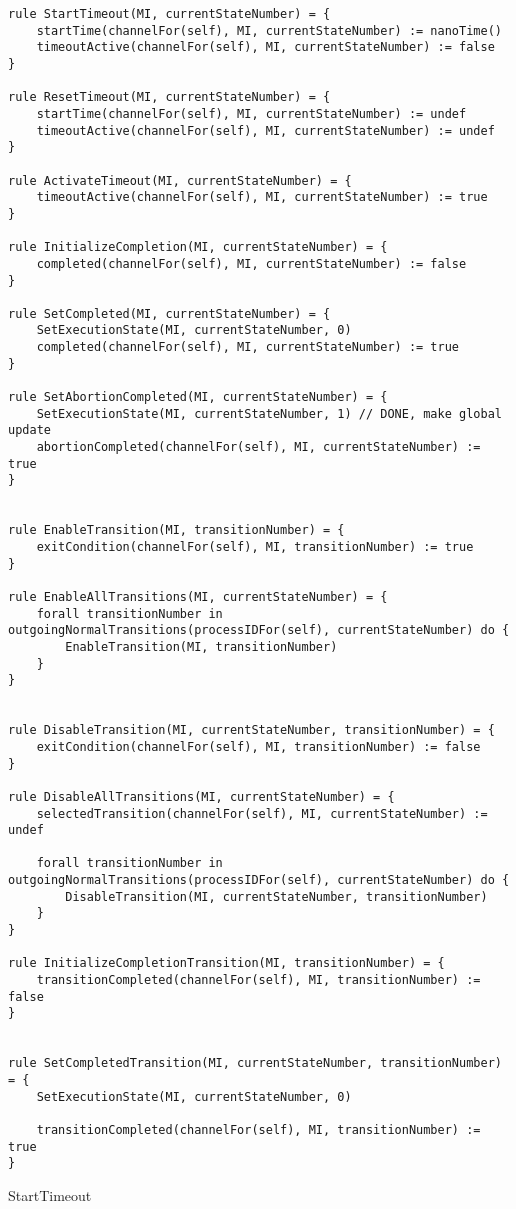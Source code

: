 \begin{listing}[H]
\begin{verbatim}
rule StartTimeout(MI, currentStateNumber) = {
    startTime(channelFor(self), MI, currentStateNumber) := nanoTime()
    timeoutActive(channelFor(self), MI, currentStateNumber) := false
}

rule ResetTimeout(MI, currentStateNumber) = {
    startTime(channelFor(self), MI, currentStateNumber) := undef
    timeoutActive(channelFor(self), MI, currentStateNumber) := undef
}

rule ActivateTimeout(MI, currentStateNumber) = {
    timeoutActive(channelFor(self), MI, currentStateNumber) := true
}

rule InitializeCompletion(MI, currentStateNumber) = {
    completed(channelFor(self), MI, currentStateNumber) := false
}

rule SetCompleted(MI, currentStateNumber) = {
    SetExecutionState(MI, currentStateNumber, 0)
    completed(channelFor(self), MI, currentStateNumber) := true
}

rule SetAbortionCompleted(MI, currentStateNumber) = {
    SetExecutionState(MI, currentStateNumber, 1) // DONE, make global update
    abortionCompleted(channelFor(self), MI, currentStateNumber) := true
}


rule EnableTransition(MI, transitionNumber) = {
    exitCondition(channelFor(self), MI, transitionNumber) := true
}

rule EnableAllTransitions(MI, currentStateNumber) = {
    forall transitionNumber in outgoingNormalTransitions(processIDFor(self), currentStateNumber) do {
        EnableTransition(MI, transitionNumber)
    }
}


rule DisableTransition(MI, currentStateNumber, transitionNumber) = {
    exitCondition(channelFor(self), MI, transitionNumber) := false
}

rule DisableAllTransitions(MI, currentStateNumber) = {
    selectedTransition(channelFor(self), MI, currentStateNumber) := undef

    forall transitionNumber in outgoingNormalTransitions(processIDFor(self), currentStateNumber) do {
        DisableTransition(MI, currentStateNumber, transitionNumber)
    }
}

rule InitializeCompletionTransition(MI, transitionNumber) = {
    transitionCompleted(channelFor(self), MI, transitionNumber) := false
}


rule SetCompletedTransition(MI, currentStateNumber, transitionNumber) = {
    SetExecutionState(MI, currentStateNumber, 0)

    transitionCompleted(channelFor(self), MI, transitionNumber) := true
}
\end{verbatim}
\caption{StartTimeout}
\label{lst:asm:StartTimeout}
\end{listing}





